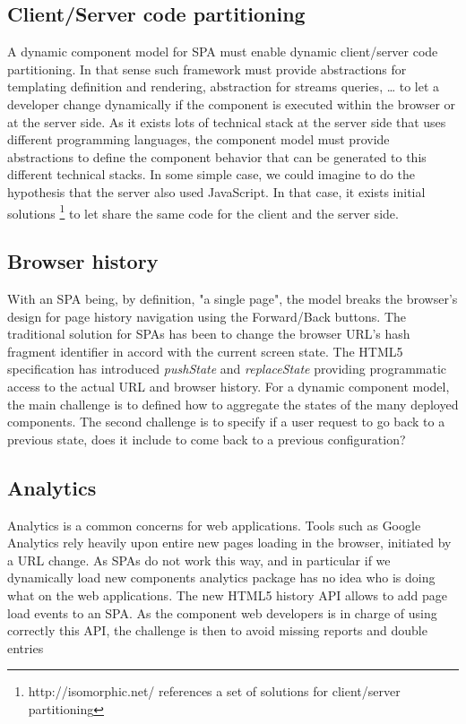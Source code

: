 \subsection{Client/Server code partitioning}
A dynamic component model for SPA must enable dynamic client/server code partitioning. In that sense such framework must provide abstractions for templating definition and rendering, abstraction for streams queries, … to let a developer change dynamically if the component is executed within the browser or at the server side. As it exists lots of technical stack at the server side that uses different programming languages, the component model must provide abstractions to define the component behavior that can be generated to this different technical stacks. In some simple case, we could imagine to do the hypothesis that the server also used JavaScript. In that case, it exists initial solutions \footnote{http://isomorphic.net/ references a set of solutions for client/server partitioning} to let share the same code for the client and the server side.  

\subsection{Browser history}
With an SPA being, by definition, "a single page", the model breaks the browser's design for page history navigation using the Forward/Back buttons. The traditional solution for SPAs has been to change the browser URL's hash fragment identifier in accord with the current screen state. 
The HTML5 specification has introduced \textit{pushState} and \textit{replaceState} providing programmatic access to the actual URL and browser history. 
For a dynamic component model, the main challenge is to defined how to aggregate the states of the many deployed components. 
The second challenge is to specify if a user request to go back to a previous state, does it include to come back to a previous configuration? 


\subsection{Analytics}

Analytics is a common concerns for web applications. Tools such as Google Analytics rely heavily upon entire new pages loading in the browser, initiated by a URL change. As SPAs do not work this way, and in particular if we dynamically load new components analytics package has no idea who is doing what on the web applications. The new HTML5 history API allows to add page load events to an SPA. As the component web developers is in charge of using correctly this API, the challenge is then to avoid missing reports and double entries   
